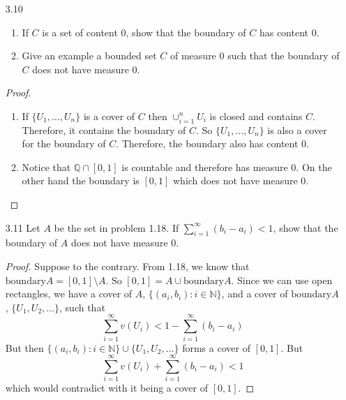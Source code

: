\begin{enumerate}
\begin{proof}
\begin{enumerate}
        \item \( \mathbb{N} \) is closed but unbounded and therefore cannot have content \( 0 \). However, given \( 0 < \epsilon < 1 \), if we take \( U_i \) to be the rectangle, centered at \( i \), such that \( v(U_i) = (\frac{\epsilon}{2})^i\) then
        \[
        \sum_{i=1}^\infty v(U_i) = \sum_{i=1}^\infty \left( \frac{\epsilon}{2} \right)^i = \frac{\epsilon}{2-\epsilon} < \epsilon 
        \]
    \end{enumerate}
    \end{proof}
    
    \item[3.10] \begin{enumerate}
        \item If \( C \) is a set of content \( 0 \), show that the boundary of \( C \) has content \( 0 \).
        
        \item Give an example a bounded set \( C \) of measure \( 0 \) such that the boundary of \( C \) does not have measure \( 0 \). 
    \end{enumerate}
    
    \begin{proof}
    \begin{enumerate}
        \item If \( \{ U_1,\ldots, U_n\} \) is a cover of \( C \) then \( \cup_{i=1}^n U_i \) is closed and contains \( C \). Therefore, it contains the boundary of \( C \). So \( \{ U_1,\ldots,U_n \} \) is also a cover for the boundary of \( C \). Therefore, the boundary also has content \( 0 \).
        
        \item Notice that \( \mathbb{Q} \cap [0,1] \) is countable and therefore has measure \( 0 \). On the other hand the boundary is \( [0,1] \) which does not have measure \( 0 \). 
    \end{enumerate}
    \end{proof}
    
    \item[3.11] Let \( A \) be the set in problem 1.18. If \( \sum_{i=1}^\infty (b_i-a_i) < 1 \), show that the boundary of \( A \) does not have measure \( 0 \).
    \begin{proof}
    Suppose to the contrary. From 1.18, we know that \( \text{boundary}A = [0,1] \setminus A \). So \( [0,1] = A \cup \text{boundary}A \). Since we can use open rectangles, we have a cover of \( A \), \( \{ (a_i,b_i):i \in \mathbb{N} \}  \), and a cover of \( \text{boundary}A \), \( \{U_1,U_2,\ldots\} \), such that
    \[
    \sum_{i=1}^\infty v(U_i) < 1 - \sum_{i=1}^\infty (b_i-a_i)
    \]
    But then \( \{ (a_i, b_i): i \in \mathbb{N} \} \cup \{ U_1,U_2,\ldots \} \) forms a cover of \( [0,1] \). But 
    \[
    \sum_{i=1}^\infty v(U_i) + \sum_{i=1}^\infty (b_i-a_i) < 1
    \]
    which would contradict with it being a cover of \( [0,1] \).
    \end{proof}
    

\end{enumerate}

